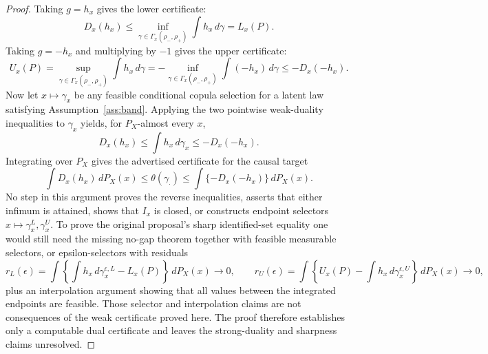 \documentclass[11pt]{article}
\theoremstyle{definition}
\theoremstyle{plain}
\theoremstyle{remark}
\begin{document}
\begin{proof}
Taking \(g=h_x\) gives the lower certificate:
\[
D_x(h_x)\le
\inf_{\gamma\in\Gamma_x(\rho_-,\rho_+)}\int h_x\,d\gamma
=L_x(P).
\]
Taking \(g=-h_x\) and multiplying by \(-1\) gives the upper certificate:
\[
U_x(P)
=\sup_{\gamma\in\Gamma_x(\rho_-,\rho_+)}\int h_x\,d\gamma
=-\inf_{\gamma\in\Gamma_x(\rho_-,\rho_+)}\int (-h_x)\,d\gamma
\le -D_x(-h_x).
\]
Now let \(x\mapsto\gamma_x\) be any feasible conditional copula selection for a latent law satisfying Assumption~\ref{ass:band}.  Applying the two pointwise weak-duality inequalities to \(\gamma_x\) yields, for \(P_X\)-almost every \(x\),
\[
D_x(h_x)\le \int h_x\,d\gamma_x\le -D_x(-h_x).
\]
Integrating over \(P_X\) gives the advertised certificate for the causal target
\[
\int D_x(h_x)\,dP_X(x)\le
\theta(\gamma_\cdot)
\le \int\{-D_x(-h_x)\}\,dP_X(x).
\]
No step in this argument proves the reverse inequalities, asserts that either infimum is attained, shows that \(I_x\) is closed, or constructs endpoint selectors \(x\mapsto\gamma_x^L,\gamma_x^U\).  To prove the original proposal's sharp identified-set equality one would still need the missing no-gap theorem together with feasible measurable selectors, or epsilon-selectors with residuals
\[
r_L(\epsilon)=\int\left\{\int h_x\,d\gamma_x^{\epsilon,L}-L_x(P)\right\}\,dP_X(x)\to0,\qquad
r_U(\epsilon)=\int\left\{U_x(P)-\int h_x\,d\gamma_x^{\epsilon,U}\right\}\,dP_X(x)\to0,
\]
plus an interpolation argument showing that all values between the integrated endpoints are feasible.  Those selector and interpolation claims are not consequences of the weak certificate proved here.  The proof therefore establishes only a computable dual certificate and leaves the strong-duality and sharpness claims unresolved.
\end{proof}
\end{document}
